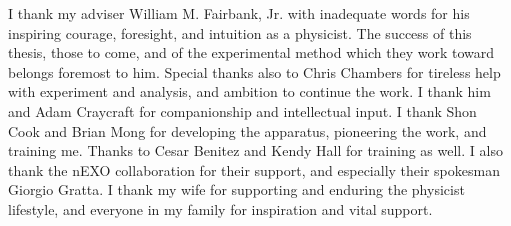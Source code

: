 \begin{acknowledgements}
I thank my adviser William M. Fairbank, Jr. with inadequate words for his inspiring courage, foresight, and intuition as a physicist.  The success of this thesis, those to come, and of the experimental method which they work toward belongs foremost to him.  Special thanks also to Chris Chambers for tireless help with experiment and analysis, and ambition to continue the work.  I thank him and Adam Craycraft for companionship and intellectual input.  I thank Shon Cook and Brian Mong for developing the apparatus, pioneering the work, and training me.  Thanks to Cesar Benitez and Kendy Hall for training as well.  I also thank the nEXO collaboration for their support, and especially their spokesman Giorgio Gratta.  I thank my wife for supporting and enduring the physicist lifestyle, and everyone in my family for inspiration and vital support.

\end{acknowledgements}